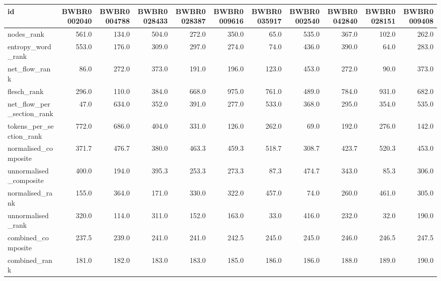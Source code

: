 \begin{tabular}{lrrrrrrrrrr}
\toprule
id & BWBR0002040 & BWBR0004788 & BWBR0028433 & BWBR0028387 & BWBR0009616 & BWBR0035917 & BWBR0002540 & BWBR0042840 & BWBR0028151 & BWBR0009408 \\
\midrule
nodes\_rank & 561.0 & 134.0 & 504.0 & 272.0 & 350.0 & 65.0 & 535.0 & 367.0 & 102.0 & 262.0 \\
\cline{1-11}
entropy\_word\_rank & 553.0 & 176.0 & 309.0 & 297.0 & 274.0 & 74.0 & 436.0 & 390.0 & 64.0 & 283.0 \\
\cline{1-11}
net\_flow\_rank & 86.0 & 272.0 & 373.0 & 191.0 & 196.0 & 123.0 & 453.0 & 272.0 & 90.0 & 373.0 \\
\cline{1-11}
flesch\_rank & 296.0 & 110.0 & 384.0 & 668.0 & 975.0 & 761.0 & 489.0 & 784.0 & 931.0 & 682.0 \\
\cline{1-11}
net\_flow\_per\_section\_rank & 47.0 & 634.0 & 352.0 & 391.0 & 277.0 & 533.0 & 368.0 & 295.0 & 354.0 & 535.0 \\
\cline{1-11}
tokens\_per\_section\_rank & 772.0 & 686.0 & 404.0 & 331.0 & 126.0 & 262.0 & 69.0 & 192.0 & 276.0 & 142.0 \\
\cline{1-11}
normalised\_composite & 371.7 & 476.7 & 380.0 & 463.3 & 459.3 & 518.7 & 308.7 & 423.7 & 520.3 & 453.0 \\
\cline{1-11}
unnormalised\_composite & 400.0 & 194.0 & 395.3 & 253.3 & 273.3 & 87.3 & 474.7 & 343.0 & 85.3 & 306.0 \\
\cline{1-11}
normalised\_rank & 155.0 & 364.0 & 171.0 & 330.0 & 322.0 & 457.0 & 74.0 & 260.0 & 461.0 & 305.0 \\
\cline{1-11}
unnormalised\_rank & 320.0 & 114.0 & 311.0 & 152.0 & 163.0 & 33.0 & 416.0 & 232.0 & 32.0 & 190.0 \\
\cline{1-11}
combined\_composite & 237.5 & 239.0 & 241.0 & 241.0 & 242.5 & 245.0 & 245.0 & 246.0 & 246.5 & 247.5 \\
\cline{1-11}
combined\_rank & 181.0 & 182.0 & 183.0 & 183.0 & 185.0 & 186.0 & 186.0 & 188.0 & 189.0 & 190.0 \\
\cline{1-11}
\bottomrule
\end{tabular}
